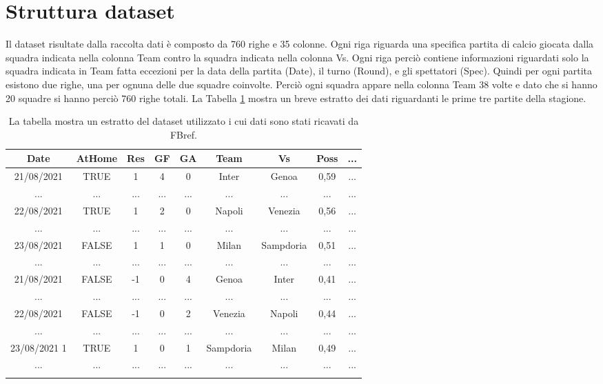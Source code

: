 \section{Struttura dataset}
Il dataset risultate dalla raccolta dati è composto da 760 righe e 35 colonne. Ogni riga riguarda una specifica partita di calcio giocata dalla squadra indicata nella colonna \textsf{Team} contro la squadra indicata nella colonna \textsf{Vs}. Ogni riga perciò contiene informazioni riguardati solo la squadra indicata in \textsf{Team} fatta eccezioni per la data della partita (\textsf{Date}), il turno (\textsf{Round}), e gli spettatori (\textsf{Spec}). Quindi per ogni partita esistono due righe, una per ognuna delle due squadre coinvolte. Perciò ogni squadra appare nella colonna \textsf{Team} 38 volte e dato che si hanno 20 squadre si hanno perciò 760 righe totali. %
La Tabella \ref{tab:db} mostra un breve estratto dei dati riguardanti le prime tre partite della stagione. 
	\begin{table}[!ht]%

	\renewcommand{\arraystretch}{1.7}
	\centering
	\begin{tabular}{c c c c c c c c c  }
		\hline	

		\textbf{Date} & \textbf{AtHome} & \textbf{Res} & \textbf{GF} & \textbf{GA} & \textbf{Team} & \textbf{Vs} & \textbf{Poss} & \textbf{...}   \\	
		\hline	
		21/08/2021 & TRUE & 1 & 4 & 0 & Inter & Genoa & 0,59 & ... \\
		... & ... & ... & ... & ... & ... & ... & ... & ... \\
		22/08/2021  & TRUE & 1 & 2 & 0 & Napoli & Venezia & 0,56 & ... \\
		... & ... & ... & ... & ... & ... & ... & ... & ...  \\
		23/08/2021  & FALSE & 1 & 1 & 0 & Milan & Sampdoria & 0,51 & ... \\		
		... & ... & ... & ... & ... & ... & ... & ... & ... \\
		21/08/2021  & FALSE & -1 & 0 & 4 & Genoa & Inter & 0,41 & ... \\
		... & ... & ... & ... & ... & ... & ... & ... & ...  \\
		22/08/2021  & FALSE & -1 & 0 & 2 & Venezia & Napoli & 0,44 & ... \\
		... & ... & ... & ... & ... & ... & ... & ... & ...  \\
		23/08/2021 1 & TRUE & 1 & 0 & 1 & Sampdoria & Milan & 0,49 & ... \\
		... & ... & ... & ... & ... & ... & ... & ... & ...  \\
		\hline
		& & & & & & & & \\
		
		
		
	\end{tabular} \hbox{}
	
	\caption{La tabella mostra un estratto del dataset utilizzato i cui dati sono stati ricavati da FBref.} \label{tab:db}
\end{table}

